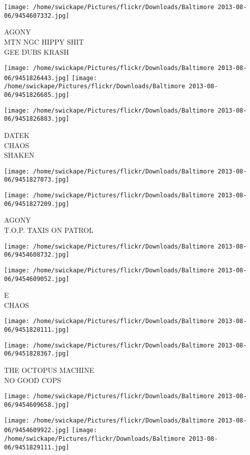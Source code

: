 \documentclass[10pt,letterpaper]{article}
\begin{document}
\vspace{0.25in}
\texttt{[image: /home/swickape/Pictures/flickr/Downloads/Baltimore 2013-08-06/9454607332.jpg]}

AGONY\\
MTN NGC HIPPY SHIT\\
GEE DUBS KRASH
\pagebreak

\texttt{[image: /home/swickape/Pictures/flickr/Downloads/Baltimore 2013-08-06/9451826443.jpg]}
\texttt{[image: /home/swickape/Pictures/flickr/Downloads/Baltimore 2013-08-06/9451826685.jpg]}

\texttt{[image: /home/swickape/Pictures/flickr/Downloads/Baltimore 2013-08-06/9451826883.jpg]}

DATEK\\
CHAOS\\
SHAKEN
\pagebreak

\texttt{[image: /home/swickape/Pictures/flickr/Downloads/Baltimore 2013-08-06/9451827073.jpg]}

\vspace{0.25in}
\texttt{[image: /home/swickape/Pictures/flickr/Downloads/Baltimore 2013-08-06/9451827209.jpg]}

AGONY\\
T.O.P. TAXIS ON PATROL
\pagebreak

\texttt{[image: /home/swickape/Pictures/flickr/Downloads/Baltimore 2013-08-06/9454608732.jpg]}

\vspace{0.25in}
\texttt{[image: /home/swickape/Pictures/flickr/Downloads/Baltimore 2013-08-06/9454609052.jpg]}

E\\
CHAOS
\pagebreak

\texttt{[image: /home/swickape/Pictures/flickr/Downloads/Baltimore 2013-08-06/9451828111.jpg]}

\vspace{0.25in}
\texttt{[image: /home/swickape/Pictures/flickr/Downloads/Baltimore 2013-08-06/9451828367.jpg]}

THE OCTOPUS MACHINE\\
NO GOOD COPS
\pagebreak

\texttt{[image: /home/swickape/Pictures/flickr/Downloads/Baltimore 2013-08-06/9454609658.jpg]}

\vspace{0.25in}
\texttt{[image: /home/swickape/Pictures/flickr/Downloads/Baltimore 2013-08-06/9454609922.jpg]}
\texttt{[image: /home/swickape/Pictures/flickr/Downloads/Baltimore 2013-08-06/9451829111.jpg]}
\end{document}
